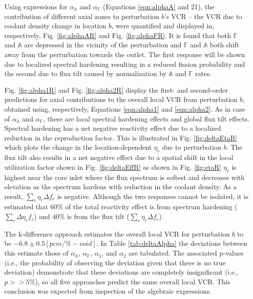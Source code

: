 \documentclass[11pt]{article}
\newcommand{\A}[0]{\mathbb{A}}
\newcommand{\F}[0]{\mathbb{F}}
\begin{document}
Using expressions for $\alpha_\A$ and $\alpha_\F$ (Equations \ref{eqn:alphaA} and 21), the contribution of different axial zones to perturbation $b$'s VCR -- the VCR due to coolant density change in location $b$, were quantified and displayed in, respectively, Fig. \ref{fig:alphaAR} and Fig. \ref{fig:alphaFR}.
It is found that both $\F$ and $\A$ are depressed in the vicinity of the perturbation and $\F$ and $\A$ both shift away from the perturbation towards the outlet.
The first response will be shown due to localized spectral hardening resulting in a reduced fission probability and the second due to flux tilt caused by normalization by $\A$ and $\F$ rates.

Fig. \ref{fig:alpha1R} and Fig. \ref{fig:alpha2R} display the first- and second-order predictions for axial contributions to the overall local VCR from perturbation $b$, obtained using, respectively, Equations \ref{eqn:alpha1} and \ref{eqn:alpha2}.
As in case of $\alpha_\A$ and $\alpha_\F$, there are local spectral hardening effects and global flux tilt effects.
Spectral hardening has a net negative reactivity effect due to a localized reduction in the reproduction factor.
This is illustrated in Fig. \ref{fig:deltaEtaR} which plots the change in the location-dependent $\eta_r$ due to perturbation $b$.
The flux tilt also results in a net negative effect due to a spatial shift in the local utilization factor shown in Fig. \ref{fig:deltaEffR} as shown in Fig. \ref{fig:etaR} $\eta_r$ is highest near the core inlet where the flux spectrum is softest and decreases with elevation as the spectrum hardens with reduction in the coolant density.
As a result, $\sum_r{\eta_r\Delta f_r}$ is negative.
Although the two responses cannot be isolated, it is estimated that $60\%$ of the total reactivity effect is from spectrum hardening ($\sum_r{\Delta\eta_r f_r}$) and $40\%$ is from the flux tilt ($\sum_r{\eta_r \Delta f_r}$).

The k-difference approach estimates the overall local VCR for perturbation $b$ to be $-6.8 \pm 0.5 [pcm/\%-void]$.
In Table \ref{tab:deltaAlpha} the deviations between this estimate those of $\alpha_\A$, $\alpha_\F$, $\alpha_1$, and $\alpha_2$ are tabulated.
The associated p-values (i.e., the probability of observing the deviation given that there is no true deviation) demonstrate that these deviations are completely insignificant (i.e., $p>>5\%$), so all five approaches predict the same overall local VCR.
This conclusion was expected from inspection of the algebraic expressions.
\end{document}
